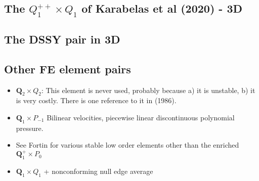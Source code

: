 \subsection{The $Q_1^{++} \times Q_1$ of Karabelas et al (2020) - 3D} \label{ss:Q1Q1bb_3D}


\subsection{The DSSY pair in 3D} \label{ss:dssy_3D}


\subsection{Other FE element pairs}

\begin{itemize}

\item ${\bm Q}_2\times Q_2$: This element is never used, probably because 
a) it is unstable, b) it is very costly. 
There is one reference to it in \textcite{hufb86} (1986).

\item ${\bm Q}_1\times P_{-1}$ Bilinear velocities,  piecewise linear discontinuous polynomial pressure.

\item See Fortin \cite{fort81} for various stable low order elements other than the enriched 
${\bm Q}_1^+ \times P_0$

\item ${\bm Q}_1\times Q_1$ + nonconforming null edge average \cite{fros07}

\end{itemize}


